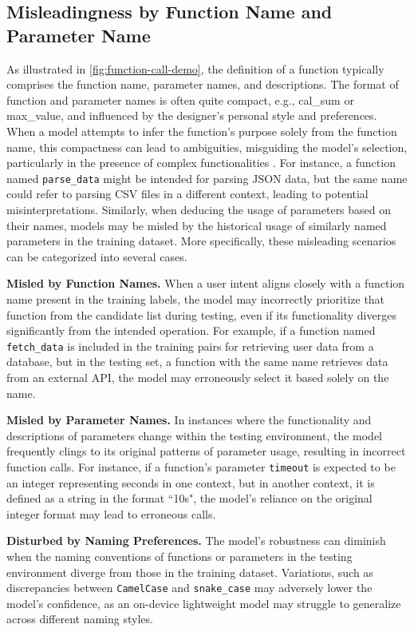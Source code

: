\documentclass{article}
\begin{document}
\subsection{Misleadingness by Function Name and Parameter Name}
\label{sec:misleading-issue}

As illustrated in \autoref{fig:function-call-demo}, the definition of a function typically comprises the function name, parameter names, and descriptions. The format of function and parameter names is often quite compact, e.g., cal\_sum or max\_value, and influenced by the designer's personal style and preferences. When a model attempts to infer the function's purpose solely from the function name, this compactness can lead to ambiguities, misguiding the model's selection, particularly in the presence of complex functionalities \citep{gunter1992semantics}. For instance, a function named \texttt{parse\_data} might be intended for parsing JSON data, but the same name could refer to parsing CSV files in a different context, leading to potential misinterpretations. Similarly, when deducing the usage of parameters based on their names, models may be misled by the historical usage of similarly named parameters in the training dataset. More specifically, these misleading scenarios can be categorized into several cases.

\textbf{Misled by Function Names.} When a user intent aligns closely with a function name present in the training labels, the model may incorrectly prioritize that function from the candidate list during testing, even if its functionality diverges significantly from the intended operation. For example, if a function named \texttt{fetch\_data} is included in the training pairs for retrieving user data from a database, but in the testing set, a function with the same name retrieves data from an external API, the model may erroneously select it based solely on the name.

\textbf{Misled by Parameter Names.} In instances where the functionality and descriptions of parameters change within the testing environment, the model frequently clings to its original patterns of parameter usage, resulting in incorrect function calls. For instance, if a function's parameter \texttt{timeout} is expected to be an integer representing seconds in one context, but in another context, it is defined as a string in the format ``10s", the model's reliance on the original integer format may lead to erroneous calls.

\textbf{Disturbed by Naming Preferences.} The model's robustness can diminish when the naming conventions of functions or parameters in the testing environment diverge from those in the training dataset. Variations, such as discrepancies between \texttt{CamelCase} and \texttt{snake\_case} may adversely lower the model's confidence, as an on-device lightweight model may struggle to generalize across different naming styles.
\end{document}
